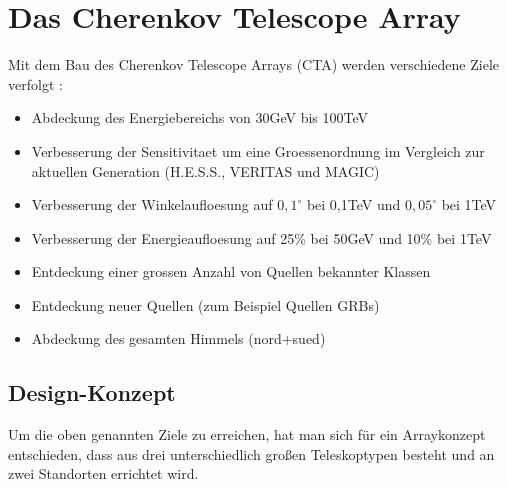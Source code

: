 \chapter{Das Cherenkov Telescope Array}
Mit dem Bau des Cherenkov Telescope Arrays (CTA) werden verschiedene Ziele verfolgt \cite{NextGen}:
\begin{itemize}

\item Abdeckung des Energiebereichs von 30GeV bis 100TeV
\item Verbesserung der Sensitivitaet um eine Groessenordnung im Vergleich zur aktuellen Generation (H.E.S.S., VERITAS und MAGIC)
\item Verbesserung der Winkelaufloesung auf $0,1^{\circ}$ bei 0,1TeV und $0,05^{\circ}$ bei 1TeV
\item Verbesserung der Energieaufloesung auf 25\% bei 50GeV und 10\% bei 1TeV
\item Entdeckung einer grossen Anzahl von Quellen bekannter Klassen
\item Entdeckung neuer Quellen (zum Beispiel Quellen GRBs)
\item Abdeckung des gesamten Himmels (nord+sued)
\end{itemize}

\section{Design-Konzept}
Um die oben genannten Ziele zu erreichen, hat man sich für ein Arraykonzept entschieden, dass aus drei unterschiedlich großen Teleskoptypen besteht und an zwei Standorten errichtet wird.

